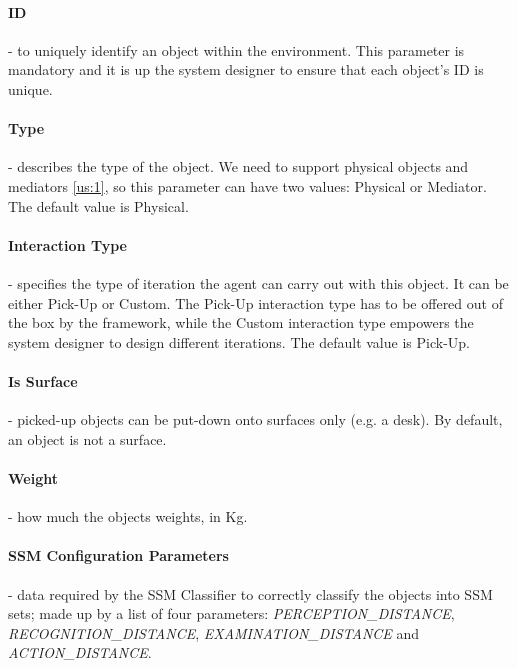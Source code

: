 \paragraph{ID} - to uniquely identify an object within the environment. This parameter is mandatory and it is up the system designer to ensure that each object's ID is unique.

\paragraph{Type} - describes the type of the object. We need to support physical objects and mediators \ref{us:1}, so this parameter can have two values: Physical or Mediator. The default value is Physical.

\paragraph{Interaction Type} - specifies the type of iteration the agent can carry out with this object. It can be either Pick-Up or Custom. The Pick-Up interaction type has to be offered out of the box by the framework, while the Custom interaction type empowers the system designer to design different iterations. The default value is Pick-Up.

\paragraph{Is Surface} - picked-up objects can be put-down onto surfaces only (e.g. a desk). By default, an object is not a surface.

\paragraph{Weight} - how much the objects weights, in Kg.

\paragraph{SSM Configuration Parameters} - data required by the SSM Classifier to correctly classify the objects into SSM sets; made up by a list of four parameters: \emph{PERCEPTION\_DISTANCE}, \emph{RECOGNITION\_DISTANCE}, \emph{EXAMINATION\_DISTANCE} and \emph{ACTION\_DISTANCE}.
